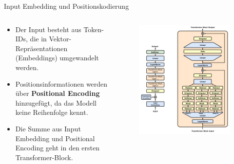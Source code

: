 \documentclass[aspectratio=1610, xcolor=dvipsnames, 9pt]{beamer}
\begin{document}
\begin{frame}{Input Embedding und Positionskodierung}
  \begin{columns}
    \begin{column}{0.5\textwidth}
      \begin{itemize}
        \item Der Input besteht aus Token-IDs, die in Vektor-Repräsentationen (Embeddings) umgewandelt werden.
        \item Positionsinformationen werden über \textbf{Positional Encoding} hinzugefügt, da das Modell keine Reihenfolge kennt.
        \item Die Summe aus Input Embedding und Positional Encoding geht in den ersten Transformer-Block.
      \end{itemize}
    \end{column}
    \begin{column}{0.5\textwidth}
      \begin{figure}
        \centering
        \includegraphics[width=0.8\columnwidth]{images/Full_GPT_architecture.png}
      \end{figure}
    \end{column}
  \end{columns}
\end{frame}
\end{document}
